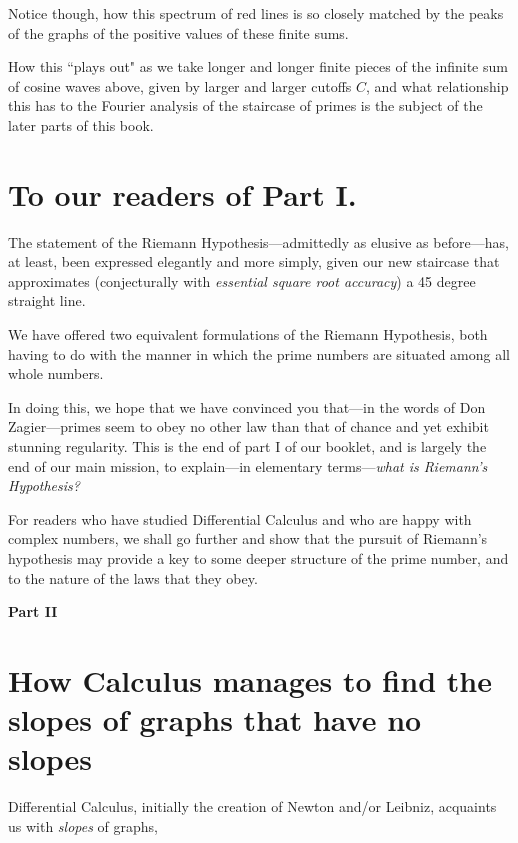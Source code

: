 \documentclass[11pt]{article}
\theoremstyle{plain}
\theoremstyle{definition}
\numberwithin{equation}{section}
\numberwithin{figure}{section}
\numberwithin{table}{section}
\begin{document}
  

 
 Notice though,  how this spectrum  of red lines is so closely matched by the peaks of the graphs of the positive values of these finite sums. 
 
   How this ``plays out" as we take longer  and longer finite pieces of the infinite sum of cosine waves above, given by  larger and larger cutoffs $C$, and what relationship this has to the Fourier analysis of the staircase of primes is the subject of the later parts of this book.


\section{ To our readers of Part I. } 
The statement of the Riemann Hypothesis---admittedly as elusive as
before---has, at least, been expressed elegantly and more simply,
given our new staircase that approximates (conjecturally with {\em
  essential square root accuracy}) a 45 degree straight line.
   
We have offered two equivalent formulations of the Riemann Hypothesis,
both having to do with the manner in which the prime numbers are
situated among all whole numbers.

In doing this, we hope that we have convinced you that---in the words
of Don Zagier---primes seem to obey no other law than that of chance
and yet exhibit stunning regularity.  This is the end of part I of our
booklet, and is largely the end of our main mission, to explain---in
elementary terms---{\em what is Riemann's Hypothesis?}
    
     
For readers who have studied Differential Calculus and who are happy
with complex numbers, we shall go further and show that the pursuit of
Riemann's hypothesis may provide a key to some deeper structure of the
prime number, and to the nature of the laws that they obey.


       
\bigskip   
\bigskip   
\bigskip   
\bigskip   
\centerline{\Large\bf Part II }
    
\bigskip 
\section{How Calculus manages to find the slopes of graphs that  
have no slopes}   
   
Differential Calculus, initially the creation of Newton and/or
Leibniz, acquaints us with {\em slopes} of graphs,
   
\end{document}
